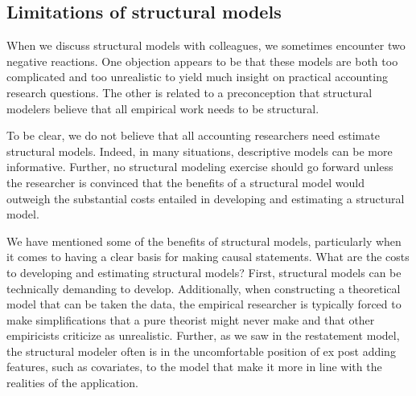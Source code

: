 \subsection{Limitations of structural models}

When we discuss structural models with colleagues, we sometimes encounter two negative reactions.
One objection appears to be that these models are both too complicated and too unrealistic to yield much insight on practical accounting research questions.
The other is related to a preconception that structural modelers believe that all empirical work needs to be structural.

To be clear, we do not believe that all accounting researchers need estimate structural models. 
Indeed, in many situations, descriptive models can be more informative.
Further, no structural modeling exercise should go forward unless the researcher is convinced that the benefits of a structural model would outweigh the substantial costs entailed in developing and estimating a structural model.

We have mentioned some of the benefits of structural models, particularly when it comes to having a clear basis for making causal statements.
What are the costs to developing and estimating structural models? 
First, structural models can be technically demanding to develop. 
Additionally, when constructing a theoretical model that can be taken the data, the empirical researcher is typically forced to make simplifications that a pure theorist might never make and that other empiricists criticize as unrealistic.
Further, as we saw in the restatement model, the structural modeler often is in the uncomfortable position of ex post adding features, such as covariates, to the model that make it more in line with the realities of the application.

